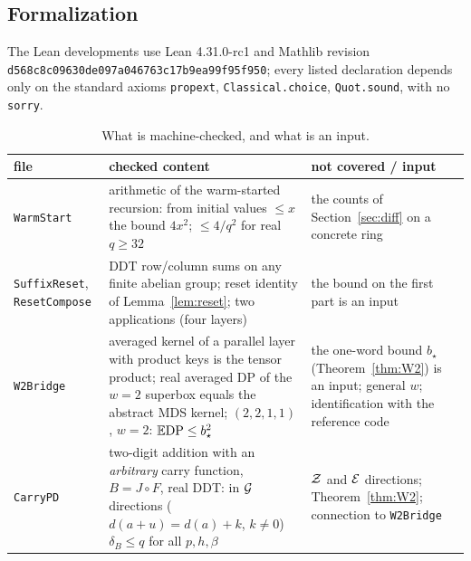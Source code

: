 \subsection{Formalization}
The Lean developments use Lean 4.31.0-rc1 and Mathlib revision
\texttt{d568c8c0}\allowbreak\texttt{9630de09}\allowbreak\texttt{7a046763}\allowbreak\texttt{c17b9ea9}\allowbreak\texttt{9f95f950}; every listed declaration depends only on the
standard axioms \texttt{propext}, \texttt{Classical.choice}, \texttt{Quot.sound}, with no \texttt{sorry}.
\begin{table}[!htbp]\footnotesize
\caption{What is machine-checked, and what is an input.}\label{tab:lean}
\begin{tabular}{p{}p{}p{}}
\toprule
file & checked content & not covered / input\\
\midrule
\texttt{WarmStart} & arithmetic of the warm-started recursion: from initial values $\le x$ the bound $4x^2$; $\le4/q^2$ for real $q\ge32$ & the counts of Section~\ref{sec:diff} on a concrete ring\\
\texttt{SuffixReset}, \texttt{ResetCompose} & DDT row/column sums on any finite abelian group; reset identity of Lemma~\ref{lem:reset}; two applications (four layers) & the bound on the first part is an input\\
\texttt{W2Bridge} & averaged kernel of a parallel layer with product keys is the tensor product; real averaged DP of the $w=2$ superbox equals the abstract MDS kernel; $(2,2,1,1)$, $w=2$: $\mathbb{E}\mathrm{DP}\le b_\star^2$ & the one-word bound $b_\star$ (Theorem~\ref{thm:W2}) is an input; general $w$; identification with the reference code\\
\texttt{CarryPD} & two-digit addition with an \emph{arbitrary} carry function, $B=J\circ F$, real DDT: in $\mathcal{G}$ directions ($d(a+u)=d(a)+k$, $k\ne0$) $\delta_B\le q$ for all $p,h,\beta$ & $\mathcal{Z}$ and $\mathcal{E}$ directions; Theorem~\ref{thm:W2}; connection to \texttt{W2Bridge}\\
\bottomrule
\end{tabular}
\end{table}
